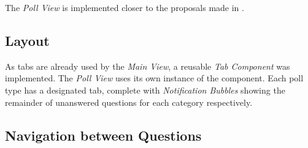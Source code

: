 The \emph{Poll View} is implemented closer to the proposals made in .	

\subsection{Layout}

As tabs are already used by the \emph{Main View}, a reusable \emph{Tab Component} was implemented. The \emph{Poll View} uses its own instance of the component. Each poll type has a designated tab, complete with \emph{Notification Bubbles} showing the remainder of unanswered questions for each category respectively.

\subsection{Navigation between Questions}
